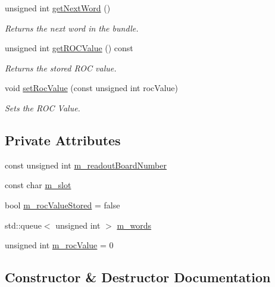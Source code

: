 \begin{DoxyCompactItemize}
unsigned int \hyperlink{class_word_bundle_a950e328fdf8b00e59b2d68da5182763f}{get\+Next\+Word} ()
\begin{DoxyCompactList}\small\item\em Returns the next word in the bundle. \end{DoxyCompactList}\item 
unsigned int \hyperlink{class_word_bundle_ad2c91f230ac93d19900eba6b2c64d0e9}{get\+R\+O\+C\+Value} () const
\begin{DoxyCompactList}\small\item\em Returns the stored R\+OC value. \end{DoxyCompactList}\item 
void \hyperlink{class_word_bundle_a15e13fdd7380c72be2f42013560d62c3}{set\+Roc\+Value} (const unsigned int roc\+Value)
\begin{DoxyCompactList}\small\item\em Sets the R\+OC Value. \end{DoxyCompactList}\end{DoxyCompactItemize}
\subsection*{Private Attributes}
\begin{DoxyCompactItemize}
\item 
const unsigned int \hyperlink{class_word_bundle_a8c6594819625e90aebfd248a8c11916b}{m\+\_\+readout\+Board\+Number}
\item 
const char \hyperlink{class_word_bundle_aad119e71fa785078734438dd49c4dec0}{m\+\_\+slot}
\item 
bool \hyperlink{class_word_bundle_a7605157c872054d7ab42b590fac97ca7}{m\+\_\+roc\+Value\+Stored} = false
\item 
std\+::queue$<$ unsigned int $>$ \hyperlink{class_word_bundle_a58233a5455b9a594e3441dd79e3d6a3b}{m\+\_\+words}
\item 
unsigned int \hyperlink{class_word_bundle_a2510a567b83584e8b53395168d53c401}{m\+\_\+roc\+Value} = 0
\end{DoxyCompactItemize}


\subsection{Constructor \& Destructor Documentation}
\mbox{\label{class_word_bundle_aa619f7a96823c2dfe048676e65064ca4}} 
